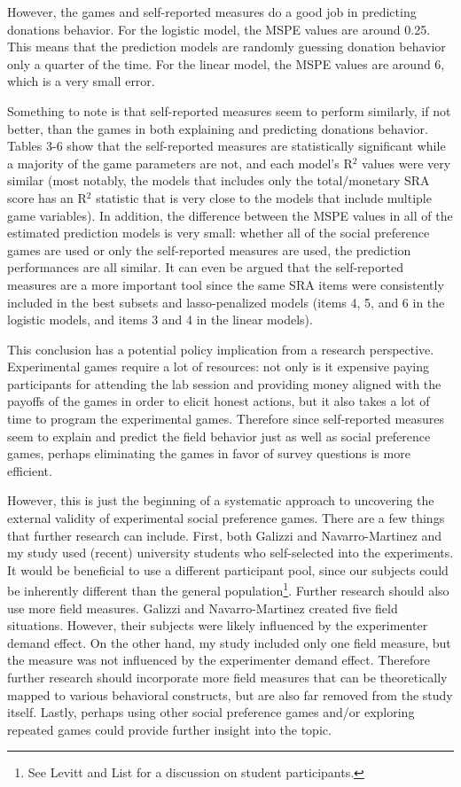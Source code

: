 \documentclass[12pt]{article}
\begin{document}
However, the games and self-reported measures do a good job in predicting donations behavior. For the logistic model, the MSPE values are around 0.25. This means that the prediction models are randomly guessing donation behavior only a quarter of the time. For the linear model, the MSPE values are around 6, which is a very small error. 

Something to note is that self-reported measures seem to perform similarly, if not better, than the games in both explaining and predicting donations behavior. Tables 3-6 show that the self-reported measures are statistically significant while a majority of the game parameters are not, and each model\rq s R$^{2}$ values were very similar (most notably, the models that includes only the total/monetary SRA score has an R$^{2}$ statistic that is very close to the models that include multiple game variables). In addition, the difference between the MSPE values in all of the estimated prediction models is very small: whether all of the social preference games are used or only the self-reported measures are used, the prediction performances are all similar. It can even be argued that the self-reported measures are a more important tool since the same SRA items were consistently included in the best subsets and lasso-penalized models (items 4, 5, and 6 in the logistic models, and items 3 and 4 in the linear models).

This conclusion has a potential policy implication from a research perspective. Experimental games require a lot of resources: not only is it expensive paying participants for attending the lab session and providing money aligned with the payoffs of the games in order to elicit honest actions, but it also takes a lot of time to program the experimental games. Therefore since self-reported measures seem to explain and predict the field behavior just as well as social preference games, perhaps eliminating the games in favor of survey questions is more efficient.

However, this is just the beginning of a systematic approach to uncovering the external validity of experimental social preference games. There are a few things that further research can include. First, both Galizzi and Navarro-Martinez and my study used (recent) university students who self-selected into the experiments. It would be beneficial to use a different participant pool, since our subjects could be inherently different than the general population\footnote{See Levitt and List for a discussion on student participants.}. Further research should also use more field measures. Galizzi and Navarro-Martinez created five field situations. However, their subjects were likely influenced by the experimenter demand effect. On the other hand, my study included only one field measure, but the measure was not influenced by the experimenter demand effect. Therefore further research should incorporate more field measures that can be theoretically mapped to various behavioral constructs, but are also far removed from the study itself. Lastly, perhaps using other social preference games and/or exploring repeated games could provide further insight into the topic.
\end{document}
